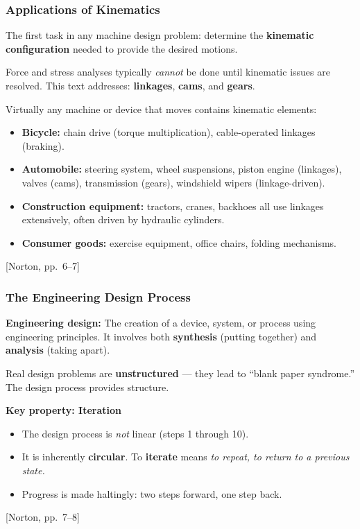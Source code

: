 \documentclass[10pt,aspectratio=43]{beamer}
\newcommand{\pref}[1]{\vfill\hfill{\scriptsize\color{gray}[Norton, pp.~#1]}}
\begin{document}
\begin{frame}
\frametitle{Applications of Kinematics}

The first task in any machine design problem: determine the \textbf{kinematic configuration} needed to provide the desired motions.

\vspace{4pt}
\begin{yellowbox}
Force and stress analyses typically \emph{cannot} be done until kinematic issues are resolved. This text addresses: \textbf{linkages}, \textbf{cams}, and \textbf{gears}.
\end{yellowbox}

\vspace{6pt}
Virtually any machine or device that moves contains kinematic elements:
\begin{itemize}
  \item \textbf{Bicycle:} chain drive (torque multiplication), cable-operated linkages (braking).
  \item \textbf{Automobile:} steering system, wheel suspensions, piston engine (linkages), valves (cams), transmission (gears), windshield wipers (linkage-driven).
  \item \textbf{Construction equipment:} tractors, cranes, backhoes all use linkages extensively, often driven by hydraulic cylinders.
  \item \textbf{Consumer goods:} exercise equipment, office chairs, folding mechanisms.
\end{itemize}
\pref{6--7}
\end{frame}


\begin{frame}
\frametitle{The Engineering Design Process}

\begin{yellowbox}
\textbf{Engineering design:} The creation of a device, system, or process using engineering principles. It involves both \textbf{synthesis} (putting together) and \textbf{analysis} (taking apart).
\end{yellowbox}

\vspace{4pt}
Real design problems are \textbf{unstructured} --- they lead to ``blank paper syndrome.'' The design process provides structure.

\vspace{6pt}
\textbf{Key property: Iteration}
\begin{itemize}
  \item The design process is \emph{not} linear (steps 1 through 10).
  \item It is inherently \textbf{circular}. To \textbf{iterate} means \emph{to repeat, to return to a previous state.}
  \item Progress is made haltingly: two steps forward, one step back.
\end{itemize}
\pref{7--8}
\end{frame}
\end{document}
